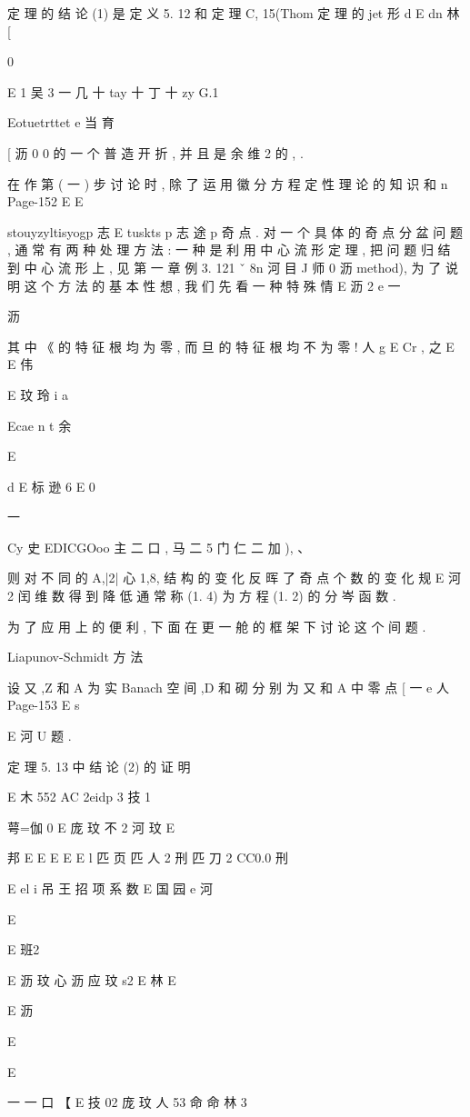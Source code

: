 {{{{{{{{{{{定 理 的 结 论 (1) 是 定 义 5. 12 和 定 理 C, 15(Thom 定 理 的 jet 形
d
E dn 林
[

0

E
1 吴
3 一 几 十 tay 十 丁 十 zy G.1

Eotuetrttet e 当 育

[ 沥
0 0
的 一 个 普 造 开 折 , 并 且 是 余 维 2 的 , .

在 作 第 ( 一 ) 步 讨 论 时 , 除 了 运 用 徽 分 方 程 定 性 理 论 的 知 识 和
n
Page-152
E E

stouyzyltisyogp 志 E
tuskts p 志 途 p
奇 点 . 对 一 个 具 体 的 奇 点 分 盆 问 题 , 通 常 有 两 种 处 理 方 法 : 一 种 是
利 用 中 心 流 形 定 理 , 把 问 题 归 结 到 中 心 流 形 上 , 见 第 一 章 例 3. 121 ˇ
8n 河 目 J 师 0 沥
method), 为 了 说 明 这 个 方 法 的 基 本 性 想 , 我 们 先 看 一 种 特 殊 情
E 沥 2 e 一

沥

其 中 《 的 特 征 根 均 为 零 , 而 旦 的 特 征 根 均 不 为 零 ! 人 g E Cr , 之
E
E 伟

E 玟 玲
i
a

Ecae n t 余

E

d
E 标 逊 6 E
0

一 {Cy 史 EDICGOoo 主 二 口 , 马 二 5 门 仁 二 加 ),
、

则 对 不 同 的 A,|2| 心 1,8, 结 构 的 变 化 反 晖 了 奇 点 个 数 的 变 化 规
E 河 2
闰 维 数 得 到 降 低 通 常 称 (1. 4) 为 方 程 (1. 2) 的 分 岑 函 数 .

为 了 应 用 上 的 便 利 , 下 面 在 更 一 舱 的 框 架 下 讨 论 这 个 间 题 .

Liapunov-Schmidt 方 法

设 又 ,Z 和 A 为 实 Banach 空 间 ,D 和 砌 分 别 为 又 和 A 中 零 点
[ 一 e 人
Page-153
E s

E 河 U
题 .

定 理 5. 13 中 结 论 (2) 的 证 明

E 木
552 AC 2eidp 3 技 1
{ 萼=伽 0
E 庞 玟 不 2 河 玟
E

邦 E
E E E E
l 匹 页 匹 人 2 刑 匹 刀 2 CC0.0 刑

E el i 吊 王 招
项 系 数
E 国 园 e 河

E

{ E 班2

E 沥 玟 心 沥 应 玟 s2
E
林
E

E 沥

E

E
{ 一 一 口 【
E 技 02 庞 玟 人 53 命 命 林 3

}}}}}}}}}}}}}}}
